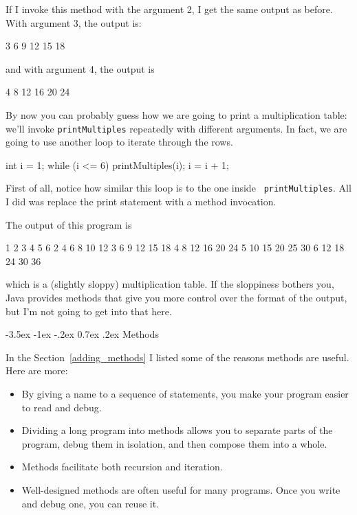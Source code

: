\documentclass{book}
\makeatletter
\renewcommand{\section}{\@startsection 
    {section} {1} {0mm}%
    {-3.5ex \@plus -1ex \@minus -.2ex}%
    {0.7ex \@plus.2ex}%
    {\normalfont\Large\bfseries}}
\makeatother
\begin{document}
If I invoke this method with the argument 2, I get the same
output as before.  With argument 3, the output is:

\begin{verbatimtab}
3   6   9   12   15   18
\end{verbatimtab}
%
and with argument 4, the output is

\begin{verbatimtab}
4   8   12   16   20   24 
\end{verbatimtab}
%
By now you can probably guess how we are going to print a
multiplication table: we'll invoke {\tt printMultiples} repeatedly with
different arguments.  In fact, we are going to use another loop to
iterate through the rows.

\begin{verbatimtab}
    int i = 1;
    while (i <= 6) {
      printMultiples(i);
      i = i + 1;
    }    
\end{verbatimtab}
%
First of all, notice how similar this loop is to the one inside {\tt
printMultiples}.  All I did was replace the print statement with a
method invocation.

The output of this program is

\begin{verbatimtab}
1   2   3   4   5   6   
2   4   6   8   10   12   
3   6   9   12   15   18   
4   8   12   16   20   24   
5   10   15   20   25   30   
6   12   18   24   30   36   
\end{verbatimtab}
%
which is a (slightly sloppy) multiplication table.  If the
sloppiness bothers you, Java provides methods that give you
more control over the format of the output, but I'm not
going to get into that here.


\section{Methods}
\label{methods}

In the Section~\ref{adding_methods} I listed some of the
reasons methods are useful.  Here are more:

\begin{itemize}

\item By giving a name to a sequence of statements, you make
your program easier to read and debug.

\item Dividing a long program into methods allows you to
separate parts of the program, debug them in isolation, and
then compose them into a whole.

\item Methods facilitate both recursion and iteration.

\item Well-designed methods are often useful for many programs.
Once you write and debug one, you can reuse it.

\end{itemize}
\end{document}
